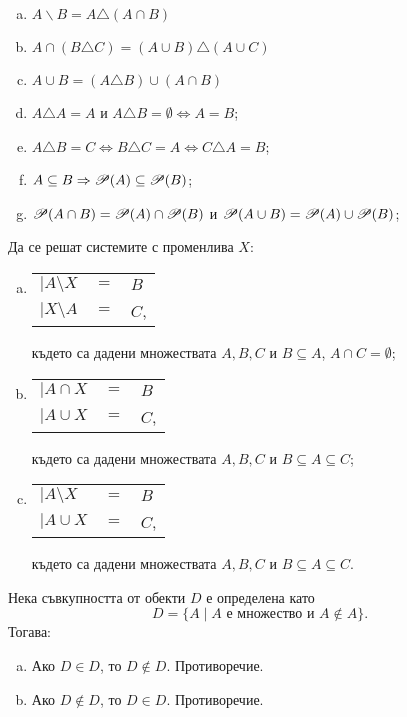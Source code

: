 \begin{problem}
\begin{enumerate}[a)]
  \item
    $A\backslash B = A\triangle(A\cap B)$
  \item
    $A\cap(B\triangle C) = (A\cup B)\triangle(A\cup C)$
  \item
    $A\cup B = (A\triangle B)\cup(A\cap B)$
  \item
    $A\triangle A = A$ и $A\triangle B = \emptyset \iff A = B$;
  \item
    $A\triangle B = C \iff B\triangle C = A \iff C\triangle A = B$;
  \item 
    $A\subseteq B \Rightarrow \mathscr{P}(A) \subseteq \mathscr{P}(B)$;
  \item
    $\mathscr{P}(A\cap B) = \mathscr{P}(A) \cap \mathscr{P}(B)$ и $\mathscr{P}(A\cup B) = \mathscr{P}(A) \cup \mathscr{P}(B)$;
  \end{enumerate}
\end{problem}

\begin{problem}
  Да се решат системите с променлива $X$:
  \begin{enumerate}[a)]
  \item
    \begin{tabular}{l c l}
      $\big|A\setminus X$ & $= $ & $ B$\\
      $\big|X\setminus A $ & $=$ & $ C$,
    \end{tabular}
    
    където са дадени множествата $A,B,C$ и $B\subseteq A$, $A\cap C = \emptyset$;
  \item
    \begin{tabular}{l c l}
      $\big|A\cap X$ & $= $ & $ B$\\
      $\big|A\cup X $ & $=$ & $ C$,
    \end{tabular}
    
    където са дадени множествата $A,B,C$ и $B\subseteq A\subseteq C$;
  \item
    \begin{tabular}{l c l}
      $\big|A\setminus X$ & $= $ & $ B$\\
      $\big|A\cup X $ & $=$ & $ C$,
    \end{tabular}

    където са дадени множествата $A,B,C$ и $B\subseteq A\subseteq C$.
  \end{enumerate}
\end{problem}

\begin{example}
  Нека съвкупността от обекти $D$ е определена като
  \[D = \{A\mid A\mbox{ е множество и } A\not\in A\}.\]
  Тогава:
  \begin{enumerate}[a)]
  \item
    Ако $D \in D$, то $D \not\in D$. Противоречие.
  \item
    Ако $D \not\in D$, то $D \in D$. Противоречие.
  \end{enumerate}
\end{example}


